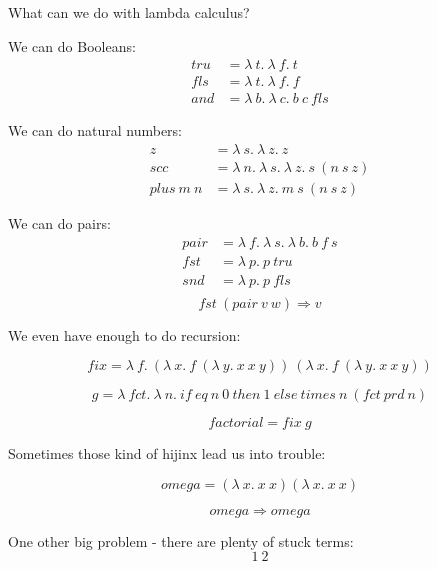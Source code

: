\begin{frame}
  What can we do with lambda calculus?
\end{frame}

\begin{frame}
  We can do Booleans:
  \begin{align*}
   tru &= \lambda~t.~\lambda~f.~t \\
   fls &= \lambda~t.~\lambda~f.~f \\
   and &= \lambda~b.~\lambda~c.~b~c~fls
  \end{align*}
\end{frame}

\begin{frame}
  We can do natural numbers:
  \begin{align*}
  z &= \lambda~s.~\lambda~z.~z \\
  scc &= \lambda~n.~\lambda~s.~\lambda~z.~s~\left(n~s~z\right) \\
  plus~m~n &= \lambda~s.~\lambda~z.~m~s~\left(n~s~z\right)
  \end{align*}
\end{frame}

\begin{frame}
  We can do pairs:
  \begin{align*}
    pair &= \lambda~f.~\lambda~s.~\lambda~b.~b~f~s \\
    fst &= \lambda~p.~p~tru \\
    snd &= \lambda~p.~p~fls \\
  \end{align*}
  \[fst~\left(pair~v~w\right) \Rightarrow v\]
\end{frame}

\begin{frame}
  We even have enough to do recursion:
  
  \[fix = \lambda~f.~\left(\lambda~x.~f~\left(\lambda~y.~x~x~y\right)\right)~\left(\lambda~x.~f~\left(\lambda~y.~x~x~y\right)\right)\]

  \[g = \lambda~fct.~\lambda~n.~if~eq~n~0~then~1~else~times~n~\left(fct~prd~n\right)\]

  \[factorial = fix~g\]
\end{frame}

\begin{frame}
  Sometimes those kind of hijinx lead us into trouble:
  
  \[omega = \left(\lambda~x.~x~x\right) \left(\lambda~x.~x~x\right)\]

  \[omega \Rightarrow omega\]
\end{frame}

\begin{frame}
  One other big problem - there are plenty of stuck terms:
  \[1~2\]
\end{frame}


